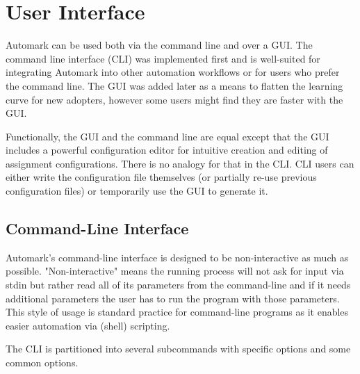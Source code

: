 \documentclass[12pt,a4paper,oneside]{report}
\begin{document}
	\section{User Interface}
	Automark can be used both via the command line and over a GUI. The command line interface (CLI) was implemented first and is well-suited for integrating Automark into other automation workflows or for users who prefer the command line. The GUI was added later as a means to flatten the learning curve for new adopters, however some users might find they are faster with the GUI.

	Functionally, the GUI and the command line are equal except that the GUI includes a powerful configuration editor for intuitive creation and editing of assignment configurations. There is no analogy for that in the CLI. CLI users can either write the configuration file themselves (or partially re-use previous configuration files) or temporarily use the GUI to generate it.

	\subsection{Command-Line Interface}
	Automark's command-line interface is designed to be non-interactive as much as possible. "Non-interactive" means the running process will not ask for input via stdin but rather read all of its parameters from the command-line and if it needs additional parameters the user has to run the program with those parameters. This style of usage is standard practice for command-line programs as it enables easier automation via (shell) scripting.

	The CLI is partitioned into several subcommands with specific options and some common options.
\end{document}
